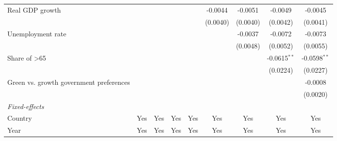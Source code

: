 \begin{table}[htbp]
\begin{tabular}{lcccccccc}
      Real GDP growth                                                                    &          &          &                &                & -0.0044         & -0.0051         & -0.0049        & -0.0045\\   
                                                                                         &          &          &                &                & (0.0040)        & (0.0040)        & (0.0042)       & (0.0041)\\   
      Unemployment rate                                                                  &          &          &                &                &                 & -0.0037         & -0.0072        & -0.0073\\   
                                                                                         &          &          &                &                &                 & (0.0048)        & (0.0052)       & (0.0055)\\   
      Share of >65                                                                       &          &          &                &                &                 &                 & -0.0615$^{**}$ & -0.0598$^{**}$\\   
                                                                                         &          &          &                &                &                 &                 & (0.0224)       & (0.0227)\\   
      Green vs. growth government preferences                                            &          &          &                &                &                 &                 &                & -0.0008\\   
                                                                                         &          &          &                &                &                 &                 &                & (0.0020)\\   
      \midrule
      \emph{Fixed-effects}\\
      Country                                                                            & Yes      & Yes      & Yes            & Yes            & Yes             & Yes             & Yes            & Yes\\  
      Year                                                                               & Yes      & Yes      & Yes            & Yes            & Yes             & Yes             & Yes            & Yes\\  

\end{tabular}
\end{table}
